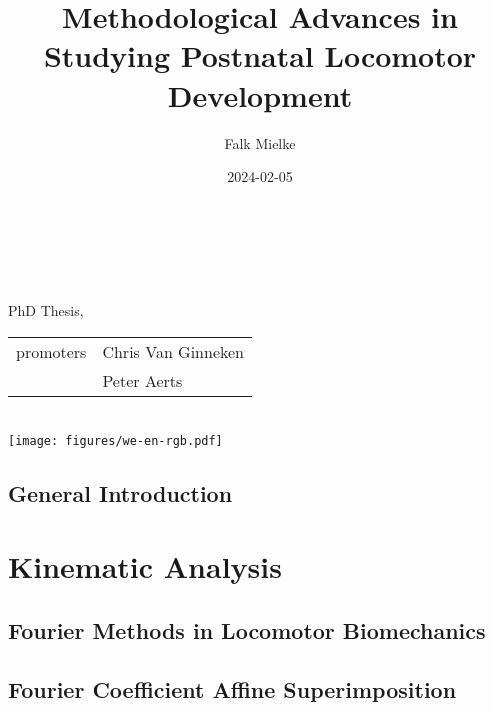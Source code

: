 \documentclass[12pt,a4paper,twoside]{report}
\title{Methodological Advances \linebreak in \linebreak Studying Postnatal Locomotor Development}
\author{Falk Mielke}
\date{2024-02-05}
\newcommand\cleartoleftpage{%
\clearpage
}
\newcommand\cleartorightpage{%
\clearpage
\hbox{}
}
\begin{document}
\doublespacing
\makeatletter
    \begin{titlepage}
    \begin{spacing}{2}
        \begin{center}
        	\ \vspace{3cm}\\
            {\LARGE \bfseries  \@title }\\[6ex] 
            {\large  \@author}\\[8ex] 
            { PhD Thesis, \@date }\\[8ex] 
            \begin{tabular}{r | l}
              promoters & Chris Van Ginneken
               \\ & Peter Aerts
			\end{tabular}\\[12ex]
            {\texttt{[image: figures/we-en-rgb.pdf]}\\[4ex]}
        \end{center}
        \end{spacing}
    \end{titlepage}
\makeatother
\thispagestyle{empty}

\onehalfspacing
\newpage
\setcounter{tocdepth}{1}
\begin{spacing}{1.05}
\tableofcontents
\end{spacing}

\cleartorightpage
\chapter{General Introduction}\label{cpt:generalintro}
\clearpage




\cleartorightpage
\part{Kinematic Analysis}\label{pt:1}
\chapter{Fourier Methods in Locomotor Biomechanics}\label{cpt:fourier_review}


\cleartoleftpage
\chapter{Fourier Coefficient Affine Superimposition}\label{cpt:fcas}

\end{document}
